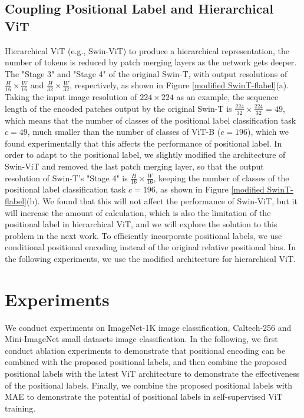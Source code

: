 \documentclass{article}
\begin{document}
\subsection{Coupling Positional Label and Hierarchical ViT}

Hierarchical ViT (e.g., Swin-ViT) to produce a hierarchical representation, the number of tokens is reduced by patch merging layers as the network gets deeper. The "Stage 3" and "Stage 4" of the original Swin-T, with output resolutions of $\frac{H}{16}\times \frac{W}{16}$ and $\frac{H}{32}\times \frac{W}{32}$, respectively, as shown in Figure \ref{modified SwinT-flabel}(a). Taking the input image resolution of $224\times 224$ as an example, the sequence length of the encoded patches output by the original Swin-T is $\frac{224}{32}\times \frac{224}{32}=49$, which means that the number of classes of the positional label classification task $c=49$, much smaller than the number of classes of ViT-B ($c=196$), which we found experimentally that this affects the performance of positional label. In order to adapt to the positional label, we slightly modified the architecture of Swin-ViT and removed the last patch merging layer, so that the output resolution of Swin-T's "Stage 4" is $\frac{H}{16}\times \frac{W}{16}$, keeping the number of classes of the positional label classification task $c=196$, as shown in Figure \ref{modified SwinT-flabel}(b). We found that this will not affect the performance of Swin-ViT, but it will increase the amount of calculation, which is also the limitation of the positional label in hierarchical ViT, and we will explore the solution to this problem in the next work. To efficiently incorporate positional labels, we use conditional positional encoding \cite{DBLP:journals/corr/abs-2102-10882} instead of the original relative positional bias. In the following experiments, we use the modified architecture for hierarchical ViT.

\section{Experiments}

We conduct experiments on ImageNet-1K \cite{5206848} image classification, Caltech-256 \cite{griffin2007caltech} and Mini-ImageNet \cite{krizhevsky2012imagenet} small datasets image classification. In the following, we first conduct ablation experiments to demonstrate that positional encoding can be combined with the proposed positional labels, and then combine the proposed positional labels with the latest ViT architecture to demonstrate the effectiveness of the positional labels. Finally, we combine the proposed positional labels with MAE to demonstrate the potential of positional labels in self-supervised ViT training.
\end{document}

